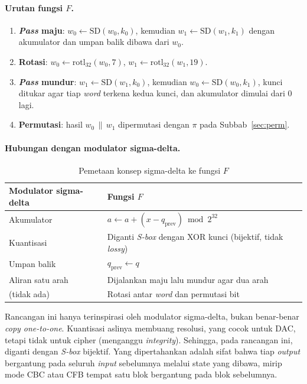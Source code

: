 \paragraph{Urutan fungsi $F$.}
\begin{enumerate}
  \item \textbf{\textit{Pass} maju}: $w_0 \leftarrow \mathrm{SD}(w_0, k_0)$, kemudian
    $w_1 \leftarrow \mathrm{SD}(w_1, k_1)$ dengan akumulator dan umpan balik dibawa dari $w_0$.
  \item \textbf{Rotasi}: $w_0 \leftarrow \mathrm{rotl}_{32}(w_0, 7)$,
    $w_1 \leftarrow \mathrm{rotl}_{32}(w_1, 19)$.
  \item \textbf{\textit{Pass} mundur}: $w_1 \leftarrow \mathrm{SD}(w_1, k_0)$, kemudian
    $w_0 \leftarrow \mathrm{SD}(w_0, k_1)$, kunci ditukar agar tiap \textit{word} terkena kedua
    kunci, dan akumulator dimulai dari 0 lagi.
  \item \textbf{Permutasi}: hasil $w_0 \,\|\, w_1$ dipermutasi dengan $\pi$ pada Subbab~\ref{sec:perm}.
\end{enumerate}

\paragraph{Hubungan dengan modulator sigma-delta.}
\begin{table}[H]
  \centering
  \caption{Pemetaan konsep sigma-delta ke fungsi $F$}
  \begin{tabular}{p{4.2cm}p{9.8cm}}
    \toprule
    Modulator sigma-delta & Fungsi $F$ \algname{} \\
    \midrule
    Akumulator & $a \leftarrow a + (x - q_{\text{prev}}) \bmod 2^{32}$ \\
    Kuantisasi & Diganti \textit{S-box} dengan XOR kunci (bijektif, tidak \textit{lossy}) \\
    Umpan balik & $q_{\text{prev}} \leftarrow q$ \\
    Aliran satu arah & Dijalankan maju lalu mundur agar dua arah \\
    (tidak ada) & Rotasi antar \textit{word} dan permutasi bit \\
    \bottomrule
  \end{tabular}
\end{table}

Rancangan ini hanya terinspirasi oleh modulator sigma-delta, bukan benar-benar \textit{copy one-to-one}. Kuantisasi 
aslinya membuang resolusi, yang cocok untuk DAC, tetapi tidak untuk cipher (menganggu \textit{integrity}). Sehingga, 
pada rancangan ini, diganti dengan \textit{S-box} bijektif. Yang dipertahankan adalah sifat bahwa tiap
\textit{output} bergantung pada seluruh \textit{input} sebelumnya melalui state yang dibawa, mirip mode CBC
atau CFB tempat satu blok bergantung pada blok sebelumnya.